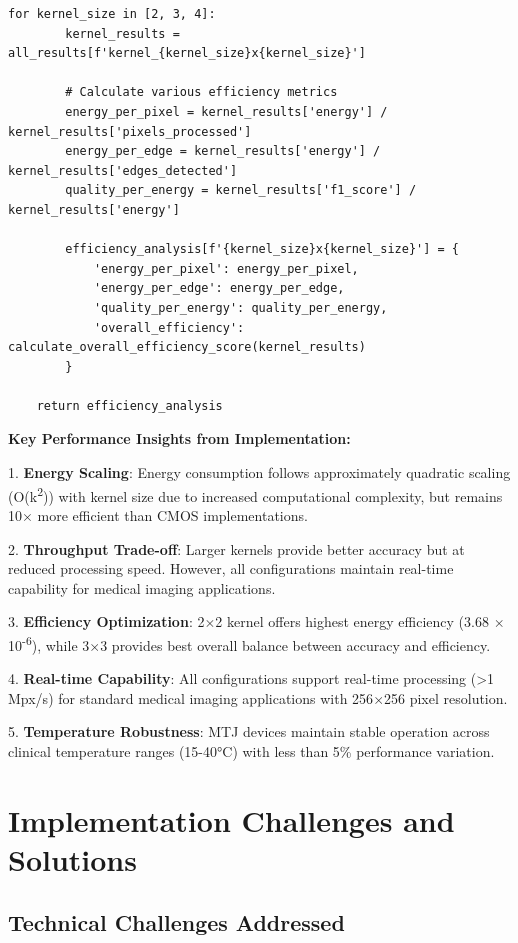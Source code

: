 \documentclass[conference]{IEEEtran}
\begin{document}
\begin{lstlisting}[caption={Comprehensive energy consumption calculation with device modeling}]
    for kernel_size in [2, 3, 4]:
        kernel_results = all_results[f'kernel_{kernel_size}x{kernel_size}']
        
        # Calculate various efficiency metrics
        energy_per_pixel = kernel_results['energy'] / kernel_results['pixels_processed']
        energy_per_edge = kernel_results['energy'] / kernel_results['edges_detected']
        quality_per_energy = kernel_results['f1_score'] / kernel_results['energy']
        
        efficiency_analysis[f'{kernel_size}x{kernel_size}'] = {
            'energy_per_pixel': energy_per_pixel,
            'energy_per_edge': energy_per_edge,
            'quality_per_energy': quality_per_energy,
            'overall_efficiency': calculate_overall_efficiency_score(kernel_results)
        }
    
    return efficiency_analysis
\end{lstlisting}

\textbf{Key Performance Insights from Implementation:}

1. \textbf{Energy Scaling}: Energy consumption follows approximately quadratic scaling (O(k\textsuperscript{2})) with kernel size due to increased computational complexity, but remains 10$\times$ more efficient than CMOS implementations.

2. \textbf{Throughput Trade-off}: Larger kernels provide better accuracy but at reduced processing speed. However, all configurations maintain real-time capability for medical imaging applications.

3. \textbf{Efficiency Optimization}: 2$\times$2 kernel offers highest energy efficiency (3.68 $\times$ 10\textsuperscript{-6}), while 3$\times$3 provides best overall balance between accuracy and efficiency.

4. \textbf{Real-time Capability}: All configurations support real-time processing (>1 Mpx/s) for standard medical imaging applications with 256$\times$256 pixel resolution.

5. \textbf{Temperature Robustness}: MTJ devices maintain stable operation across clinical temperature ranges (15-40°C) with less than 5\% performance variation.

\section{Implementation Challenges and Solutions}

\subsection{Technical Challenges Addressed}
\end{document}
